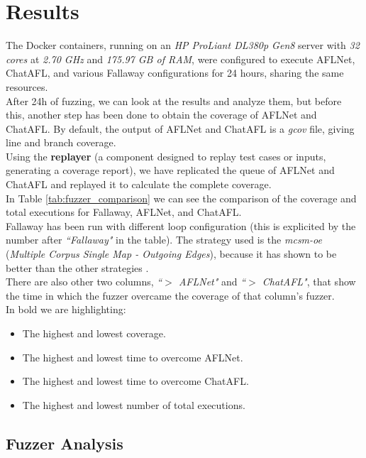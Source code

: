\chapter{Results}
\label{chap:Results}
The Docker containers, running on an \textit{HP ProLiant DL380p Gen8} server with \textit{32 cores} at \textit{2.70 GHz} and \textit{175.97 GB of RAM}, were configured to execute AFLNet, ChatAFL, and various Fallaway configurations for 24 hours, sharing the same resources.
\\After 24h of fuzzing, we can look at the results and analyze them, but before this, another step has been done to obtain the coverage of AFLNet and ChatAFL. By default, the output of AFLNet and ChatAFL is a \textit{gcov} file, giving line and branch coverage.
\\Using the \textbf{replayer} (a component designed to replay test cases or inputs, generating a coverage report), we have replicated the queue of AFLNet and ChatAFL and replayed it to calculate the complete coverage.
\\In Table \ref{tab:fuzzer_comparison} we can see the comparison of the coverage and total executions for Fallaway, AFLNet, and ChatAFL. 
\\Fallaway has been run with different loop configuration (this is explicited by the number after \textit{``Fallaway"} in the table). The strategy used is the \textit{mcsm-oe} (\textit{Multiple Corpus Single Map - Outgoing Edges}), because it has shown to be better than the other strategies \cite{Fallaway}.
\\There are also other two columns, \textit{``$>$ AFLNet"} and \textit{``$>$ ChatAFL"}, that show the time in which the fuzzer overcame the coverage of that column's fuzzer.
\\In bold we are highlighting:
\begin{itemize}
    \item The highest and lowest coverage.
    \item The highest and lowest time to overcome AFLNet.
    \item The highest and lowest time to overcome ChatAFL.
    \item The highest and lowest number of total executions.
\end{itemize}

\section{Fuzzer Analysis}

